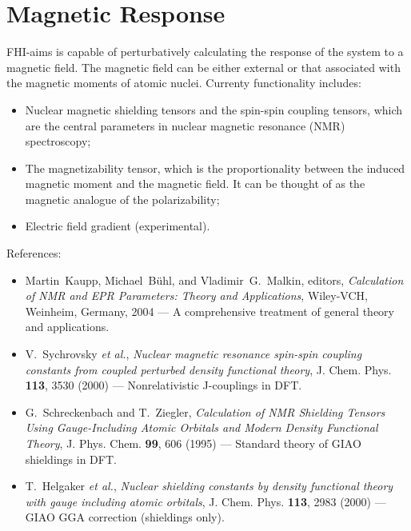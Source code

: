 \section{Magnetic Response}

FHI-aims is capable of perturbatively calculating the response of the system to a magnetic field. The magnetic field can be either external or that associated with the magnetic moments of atomic nuclei. Currenty functionality includes:
\begin{itemize}
\item Nuclear magnetic shielding tensors and the spin-spin coupling tensors, which are the central parameters in nuclear magnetic resonance (NMR) spectroscopy;
\item The magnetizability tensor, which is the proportionality between the induced magnetic moment and the magnetic field. It can be thought of as the magnetic analogue of the polarizability;
\item Electric field gradient (experimental).
\end{itemize}
References:
\begin{itemize}
\item Martin~Kaupp, Michael~B\"uhl, and Vladimir~G.~Malkin, editors, \textit{Calculation of NMR and EPR Parameters: Theory and Applications}, Wiley-VCH, Weinheim, Germany, 2004 --- A comprehensive treatment of general theory and applications.
\item V.~Sychrovsky \textit{et al.}, \textit{Nuclear magnetic resonance spin-spin coupling constants from coupled perturbed density functional theory}, J. Chem. Phys. \textbf{113}, 3530 (2000) --- Nonrelativistic J-couplings in DFT.
\item G.~Schreckenbach and T.~Ziegler, \textit{Calculation of NMR Shielding Tensors Using Gauge-Including Atomic Orbitals and Modern Density Functional Theory}, J. Phys. Chem. \textbf{99}, 606 (1995) --- Standard theory of GIAO shieldings in DFT.
\item T.~Helgaker \textit{et al.}, \textit{Nuclear shielding constants by density functional theory with gauge including atomic orbitals}, J. Chem. Phys. \textbf{113}, 2983 (2000) --- GIAO GGA correction (shieldings only).
\end{itemize}

